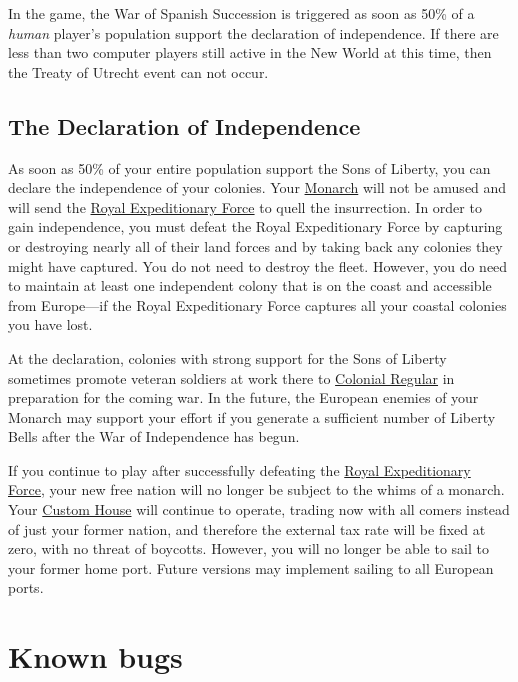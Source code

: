 \documentclass[12pt]{book}
\begin{document}
In the game, the War of Spanish Succession is triggered as soon as
50\% of a {\em human} player's population support the declaration of
independence. If there are less than two computer players still active
in the New World at this time, then the Treaty of Utrecht event can
not occur.


\hypertarget{Declaration of Independence}{\section{The Declaration
of Independence}}

As soon as 50\% of your entire population support the Sons of Liberty,
you can declare the independence of your colonies.  Your
\hyperlink{Monarch}{Monarch} will not be amused and will send the
\hyperlink{Royal Expeditionary Force}{Royal Expeditionary Force} to
quell the insurrection. In order to gain independence, you must defeat
the Royal Expeditionary Force by capturing or destroying nearly all of
their land forces and by taking back any colonies they might have
captured. You do not need to destroy the fleet.  However, you do need
to maintain at least one independent colony that is on the coast and
accessible from Europe---if the Royal Expeditionary Force captures
all your coastal colonies you have lost.

At the declaration, colonies with strong support for the Sons of
Liberty sometimes promote veteran soldiers at work there to
\hyperlink{Colonial Regular}{Colonial Regular} in preparation for the
coming war.  In the future, the European enemies of your Monarch may
support your effort if you generate a sufficient number of Liberty
Bells after the War of Independence has begun.

If you continue to play after successfully defeating the
\hyperlink{Royal Expeditionary Force}{Royal Expeditionary Force}, your
new free nation will no longer be subject to the whims of a monarch.
Your \hyperlink{Custom House}{Custom House} will continue to operate,
trading now with all comers instead of just your former nation, and
therefore the external tax rate will be fixed at zero, with no threat of
boycotts.  However, you will no longer be able to sail to your former
home port.  Future versions may implement sailing to all European ports.



\hypertarget{Known bugs}{\chapter{Known bugs}}
\end{document}

